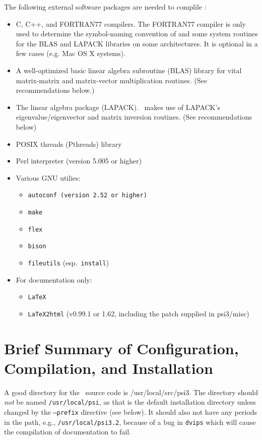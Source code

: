 \documentclass[12pt]{article}
\begin{document}
The following external software packages are needed to complile \PSIthree:
\begin{itemize}
\item C, C++, and FORTRAN77 compilers. The FORTRAN77 compiler is only
  used to determine the symbol-naming convention of and some system
  routines for the BLAS and LAPACK libraries on some architectures. It
  is optional in a few cases (e.g. Mac OS X systems).
\item A well-optimized basic linear algebra subroutine (BLAS) library
  for vital matrix-matrix and matrix-vector multiplication
  routines. (See recommendations below.)
\item The linear algebra package (LAPACK).  \PSIthree\ makes use of
  LAPACK's eigenvalue/eigenvector and matrix inversion routines.  (See
  recommendations below)
\item POSIX threads (Pthreads) library
\item Perl interpreter (version 5.005 or higher)
\item Various GNU utilies: 
\begin{itemize}
\item {\tt autoconf (version 2.52 or higher)}
\item {\tt make}
\item {\tt flex}
\item {\tt bison}
\item {\tt fileutils} (esp.\ {\tt install})
\end{itemize}
\item For documentation only:
\begin{itemize}
\item {\tt LaTeX}
\item {\tt LaTeX2html} (v0.99.1 or 1.62, including the patch supplied in
psi3/misc)
\end{itemize}
\end{itemize}

\section{Brief Summary of Configuration, Compilation, and Installation}

A good directory for the \PSIthree\ source code is /usr/local/src/psi3.
The directory should {\em not} be named {\tt /usr/local/psi}, as that is
the default installation directory unless changed by the {\tt --prefix}
directive (see below).  It should also not have any periods in the path,
e.g., {\tt /usr/local/psi3.2}, because of a bug in {\tt dvips} which will
cause the compilation of documentation to fail.
\end{document}
